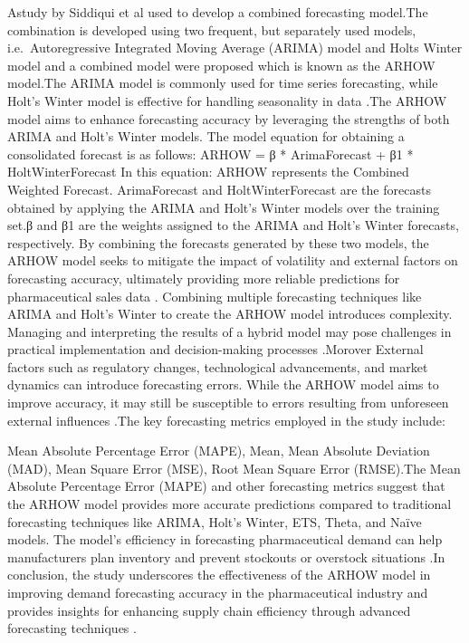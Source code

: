 \documentclass[
  authoryear,
  preprint,
  3p]{elsarticle}
\begin{document}
Astudy by Siddiqui et al used to develop a combined forecasting
model.The combination is developed using two frequent, but separately
used models, i.e.~Autoregressive Integrated Moving Average (ARIMA) model
and Holts Winter model and a combined model were proposed which is known
as the ARHOW model.The ARIMA model is commonly used for time series
forecasting, while Holt's Winter model is effective for handling
seasonality in data \citep[markovska2016comparative]{inproceedings}.The
ARHOW model aims to enhance forecasting accuracy by leveraging the
strengths of both ARIMA and Holt's Winter models. The model equation for
obtaining a consolidated forecast is as follows: ARHOW = β *
ArimaForecast + β1 * HoltWinterForecast In this equation: ARHOW
represents the Combined Weighted Forecast. ArimaForecast and
HoltWinterForecast are the forecasts obtained by applying the ARIMA and
Holt's Winter models over the training set.β and β1 are the weights
assigned to the ARIMA and Holt's Winter forecasts, respectively. By
combining the forecasts generated by these two models, the ARHOW model
seeks to mitigate the impact of volatility and external factors on
forecasting accuracy, ultimately providing more reliable predictions for
pharmaceutical sales data \citep{siddiqui2022hybrid} . Combining
multiple forecasting techniques like ARIMA and Holt's Winter to create
the ARHOW model introduces complexity. Managing and interpreting the
results of a hybrid model may pose challenges in practical
implementation and decision-making processes .Morover External factors
such as regulatory changes, technological advancements, and market
dynamics can introduce forecasting errors. While the ARHOW model aims to
improve accuracy, it may still be susceptible to errors resulting from
unforeseen external influences \citep{siddiqui2022hybrid}.The key
forecasting metrics employed in the study include:

Mean Absolute Percentage Error (MAPE), Mean, Mean Absolute Deviation
(MAD), Mean Square Error (MSE), Root Mean Square Error (RMSE).The Mean
Absolute Percentage Error (MAPE) and other forecasting metrics suggest
that the ARHOW model provides more accurate predictions compared to
traditional forecasting techniques like ARIMA, Holt's Winter, ETS,
Theta, and Naïve models. The model's efficiency in forecasting
pharmaceutical demand can help manufacturers plan inventory and prevent
stockouts or overstock situations .In conclusion, the study underscores
the effectiveness of the ARHOW model in improving demand forecasting
accuracy in the pharmaceutical industry and provides insights for
enhancing supply chain efficiency through advanced forecasting
techniques .
\end{document}
